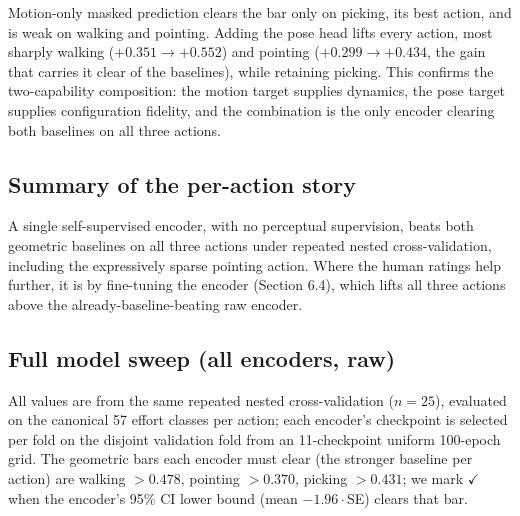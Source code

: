 \documentclass[letterpaper]{article} %
\begin{document}
Motion-only masked prediction clears the bar only on picking, its best action, and is weak on
walking and pointing. Adding the pose head {lifts every action}, most sharply walking
($+0.351 \to +0.552$) and pointing ($+0.299 \to +0.434$, the gain that carries it clear of the
baselines), while retaining picking. This confirms the two-capability composition: the motion
target supplies dynamics, the pose target supplies configuration fidelity, and the combination is
the only encoder clearing both baselines on all three actions.

\subsection{Summary of the per-action story}
A single self-supervised encoder, with no perceptual supervision, beats both geometric baselines
on all three actions under repeated nested cross-validation, including the expressively sparse
pointing action. Where the human ratings help further, it is by fine-tuning the encoder (Section
6.4), which lifts all three actions above the already-baseline-beating raw encoder.

\subsection{Full model sweep (all encoders, raw)}
\label{sec:sweep}
All values are from the same repeated nested cross-validation ($n=25$), evaluated on the canonical
57 effort classes per action; each encoder's checkpoint is selected per fold on the disjoint
validation fold from an 11-checkpoint uniform 100-epoch grid. The geometric bars each encoder must
clear (the stronger baseline per action) are {walking $>0.478$, pointing $>0.370$, picking
$>0.431$}; we mark $\checkmark$ when the encoder's 95\% CI lower bound (mean $-1.96\cdot$SE) clears
that bar.
\end{document}
